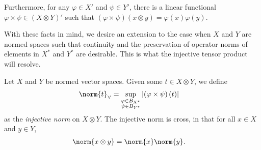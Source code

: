 Furthermore, for any $\varphi\in X'$ and $\psi\in Y'$, there is a linear functional $\varphi\times \psi\in \left( X\otimes Y \right)'$ such that $\left( \varphi\times \psi \right)\left( x\otimes y \right) = \varphi(x)\varphi(y)$.\newline

With these facts in mind, we desire an extension to the case when $X$ and $Y$ are normed spaces such that continuity and the preservation of operator norms of elements in $X^{\ast}$ and $Y^{\ast}$ are desirable. This is what the injective tensor product will resolve.
\begin{proposition}
  Let $X$ and $Y$ be normed vector spaces. Given some $t\in X\otimes Y$, we define
  \begin{align*}
    \norm{t}_{\vee} &= \sup_{\substack{\varphi\in B_{X^{\ast}}\\\psi\in B_{Y^{\ast}}}} \left\vert \left( \varphi\times \psi \right)\left( t \right) \right\vert
  \end{align*}
  as the \textit{injective norm} on $X\otimes Y$. The injective norm is cross, in that for all $x\in X$ and $y\in Y$,
  \begin{align*}
    \norm{x\otimes y} &= \norm{x}\norm{y}.
  \end{align*}
\end{proposition}
